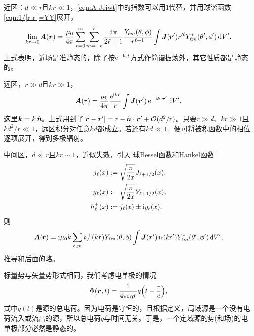 近区：$d \ll r$且$kr \ll 1$，\eqref{eqn:A-Jeiwt}中的指数可以用1代替，并用球谐函数\eqref{eqn:1/|r-r'|=YY}展开，
\[
    \lim_{kr\to0}\bm A(\bm r) = \frac{\mu_0}{4\pi}\sum_{\ell=0}^\infty\sum_{m=-\ell}^\ell\frac{4\pi}{2\ell + 1}\frac{Y_{\ell m}(\theta,\phi)}{r^{\ell+1}}\int\bm J(\bm r')r'^\ell Y^\ast_{\ell m}(\theta',\phi')\mathop{}\!\mathrm{d} V'.
\]
上式表明，近场是准静态的，除了按$\mathop{}\!\mathrm{e}^{-\mathrm{i}\omega t}$方式作简谐振荡外，其它性质都是静态的。

远区，$r \gg d$且$kr \gg 1$，
\begin{equation}
    \label{eq:ed-localized-source-far-potential}
    \bm A(\bm r) = \frac{\mu_0}{4\pi}\frac{\mathop{}\!\mathrm{e}^{\mathrm{i} kr}}r\int\bm J(\bm r')\mathop{}\!\mathrm{e}^{-\mathrm{i}\bm k\cdot\bm r'}\mathop{}\!\mathrm{d} V'.
\end{equation}
这里$\bm k = k\mathop{}\!\hat{\bm{n}}$。上式用到了$\lvert\bm r - \bm r'\rvert = r - \mathop{}\!\hat{\bm{n}} \cdot \bm r' + \mathcal{O}(d^2/r)$。只要$r \gg d$、$kr \gg 1$且$kd^2/r \ll 1$，远区积分对任意$kd$都成立。若还有$kd \ll 1$，便可将被积函数中的相位逐项展开，得到多极辐射。

中间区，$d \ll r$且$kr \sim 1$，近似失效，引入
球Bessel函数和Hankel函数
\begin{align}
    j_\ell(x) &:= \sqrt{\frac\pi{2x}}J_{\ell+1/2}(x),\\
    y_\ell(x) &:= \sqrt{\frac\pi{2x}}Y_{\ell+1/2}(x),\\
    h^\pm_\ell(x) &:= j_\ell(x) \pm \mathrm{i} y_\ell(x).
\end{align}
则
\[
    \bm A(\bm r) = \mathrm{i}\mu_0k\sum_{\ell,m}h_\ell^+(kr)Y_{\ell m}(\theta,\phi)\int\bm J(\bm r')j_\ell(kr')Y^\ast_{\ell m}(\theta',\phi')\mathop{}\!\mathrm{d} V',
\]
推导和后面的略。

标量势与矢量势形式相同，我们考虑电单极的情况
\[
    \Phi(\bm r,t) = \frac1{4\pi\varepsilon_0r}q\Bigl(t - \frac rc\Bigr),
\]
式中$q(t)$是源的总电荷。因为电荷是守恒的，且根据定义，局域源是一个没有电荷流入或流出的源，所以总电荷$q$与时间无关。于是，一个定域源的势(和场)的电单极部分必然是静态的。%

